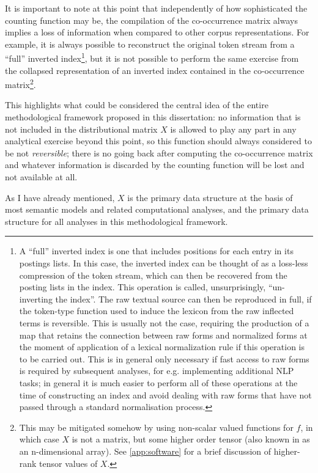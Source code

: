 It is important to note at this point that independently of how sophisticated the counting function may be, the compilation of the co-occurrence matrix always implies a loss of information when compared to other corpus representations.
For example, it is always possible to reconstruct the original token stream from a ``full'' inverted index\footnote{
    A ``full'' inverted index is one that includes positions for each entry in its postings lists.
    In this case, the inverted index can be thought of as a loss-less compression of the token stream, which can then be recovered from the posting lists in the index.
    This operation is called, unsurprisingly, ``un-inverting the index''.
    The raw textual source can then be reproduced in full, if the token-type function used to induce the lexicon from the raw inflected terms is reversible.
    This is usually not the case, requiring the production of a map that retains the connection between raw forms and normalized forms at the moment of application of a lexical normalization rule if this operation is to be carried out.
    This is in general only necessary if fast access to raw forms is required by subsequent analyses, for e.g. implementing additional NLP tasks; in general it is much easier to perform all of these operations at the time of constructing an index and avoid dealing with raw forms that have not passed through a standard normalisation process.
}, but it is not possible to perform the same exercise from the collapsed representation of an inverted index contained in the co-occurrence matrix\footnote{
    This may be mitigated somehow by using non-scalar valued functions for $f$, in which case $X$ is not a matrix, but some higher order tensor (also known in as an n-dimensional array).
    See \autoref{app:software} for a brief discussion of higher-rank tensor values of $X$.
}.

This highlights what could be considered the central idea of the entire methodological framework proposed in this dissertation: no information that is not included in the distributional matrix $X$ is allowed to play any part in any analytical exercise beyond this point, so this function should always considered to be not \emph{reversible}; there is no going back after computing the co-occurrence matrix and whatever information is discarded by the counting function will be lost and not available at all.

As I have already mentioned, $X$ is the primary data structure at the basis of most semantic models and related computational analyses, and the primary data structure for all analyses in this methodological framework.

